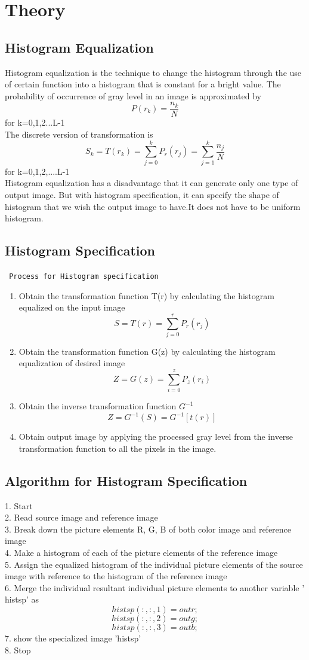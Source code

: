 \documentclass[12pt]{article}
\begin{document}
\section{Theory}
\subsection{Histogram Equalization}
Histogram equalization is the technique to change the histogram through the use of certain function into a histogram that is constant for a bright value. The probability of occurrence of gray level in an image is approximated by \\
$$P(r_k) = \frac{n_k}{N}$$  for k=0,1,2...L-1 \\
The discrete version of transformation is\\
$$ S_k = T(r_k) = \sum_{j=0}^k P_r(r_j) =  \sum_{j=1}^k\frac{n_j}{N}$$ for k=0,1,2,....L-1\\


Histogram equalization has  a disadvantage that it can generate only one type of output image. But with histogram specification, it can specify the shape of histogram that we wish the output image to have.It does not have to be uniform histogram.
\subsection{Histogram Specification}
\texttt{ Process for Histogram specification}
\begin{enumerate}
\item Obtain the transformation function T(r) by calculating the histogram equalized on the input image 
$$ S = T(r) = \sum_{j=0}^r P_r(r_j) $$
\item Obtain the transformation function G(z) by calculating the histogram equalization of desired image 
$$ Z = G(z) = \sum_{i=0}^z P_z(r_i) $$
\item Obtain the inverse transformation function $G^{-1}$\\
$$Z= G^{-1}(S) = G^{-1}[t(r)]$$
\item Obtain output image by applying the processed gray level from the inverse transformation function to all the pixels in the image.
\end{enumerate}
\subsection{Algorithm for Histogram Specification}
1. Start \\
2. Read source image and reference image\\
3. Break down the picture elements R, G, B of both color image and reference image\\
4. Make a histogram of each of the picture elements of the reference image\\
5. Assign the equalized histogram of the individual picture elements of the source image with reference to the histogram of the reference image\\
6. Merge the individual resultant individual picture elements to another variable ' histsp'  as $$ histsp(:,:,1) = outr; $$ $$ histsp(:,:,2) = outg; $$ $$ histsp(:,:,3) = outb; $$
7. show the specialized image 'histsp'\\
8. Stop
\pagebreak
\end{document}
